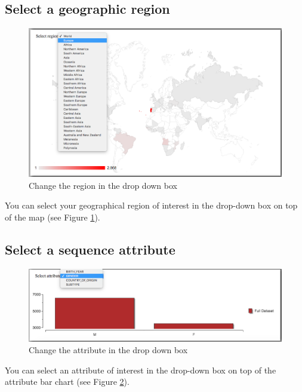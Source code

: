 \documentclass[a4paper, 11pt]{article} %
\begin{document}
\subsection{Select a geographic region}
\begin{figure}[H]
\centering
\includegraphics[scale=0.38]{images/change_country.PNG}
\vspace{-0.75cm}
\caption{Change the region in the drop down box}
\label{fig:change_region}
\end{figure}
You can select your geographical region of interest in the drop-down box on top of the map (see Figure \ref{fig:change_region}). 


\subsection{Select a sequence attribute}
\begin{figure}[H]
\centering
\includegraphics[scale=0.38]{images/change_attr.PNG}
\vspace{-0.75cm}
\caption{Change the attribute in the drop down box}
\label{fig:change_attr}
\end{figure}
You can select an attribute of interest in the drop-down box on top of the attribute bar chart (see Figure \ref{fig:change_attr}).
\end{document}
